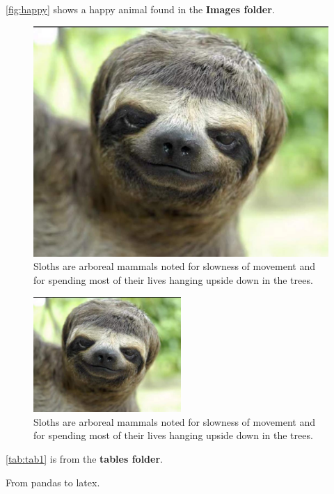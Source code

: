 \autoref{fig:happy} shows a happy animal found in the \textbf{Images folder}. 
\begin{figure}[H]
\begin{center}\includegraphics[scale=0.5]{./3_Images/Funny-Animal-Face} 
\end{center}
\caption{Sloths are arboreal mammals noted for slowness of movement and for spending most of their lives hanging upside down in the trees.}
\label{fig:happy}
\end{figure}


\begin{figure}[H]
\centering
\includegraphics[width=0.5\textwidth]{./3_Images/Funny-Animal-Face} 
\caption{Sloths are arboreal mammals noted for slowness of movement and for spending most of their lives hanging upside down in the trees.}
\label{fig:happy2}
\end{figure}



\autoref{tab:tab1} is from the \textbf{tables folder}. 
\begin{table}[H]
\caption{From pandas to latex.}
\centering
{}

\label{tab:tab1}
\end{table}

